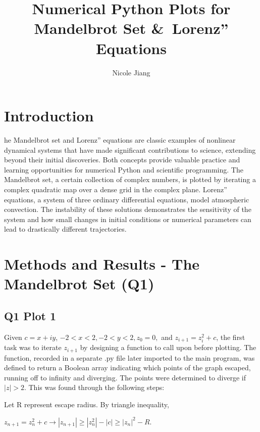\documentclass[9pt,a4paper,twocolumn,twoside]{tau-class/tau}
\title{Numerical Python Plots for Mandelbrot Set \&\ Lorenz'' Equations   }
\author{Nicole Jiang}
\begin{document}
		
    \maketitle 
    \thispagestyle{firststyle} 
    \tauabstract 
    

\section{Introduction}
    he Mandelbrot set and Lorenz'' equations are classic examples of nonlinear dynamical systems that have made significant contributions to science, extending beyond their initial discoveries. Both concepts provide valuable practice and learning opportunities for numerical Python and scientific programming. The Mandelbrot set, a certain collection of complex numbers, is plotted by iterating a complex quadratic map over a dense grid in the complex plane. Lorenz'' equations, a system of three ordinary differential equations, model atmospheric convection. The instability of these solutions demonstrates the sensitivity of the system and how small changes in initial conditions or numerical parameters can lead to drastically different trajectories. 

\section{Methods and Results - The Mandelbrot Set (Q1)}
\subsection{Q1 Plot 1}
    Given \(c = x + iy\), \(-2 < x < 2, -2 < y < 2, z_0 = 0,\) and \(z_{i + 1} = z^2_i + c\), the first task was to iterate \(z_{i+1}\) by designing a function to call upon before plotting. The function, recorded in a separate .py file later imported to the main program, was defined to return a Boolean array indicating which points of the graph escaped, running off to infinity and diverging. The points were determined to diverge if \(|z| > 2\). This was found through the following steps: \medskip

    Let R represent escape radius. By triangle inequality,
    \medskip
    
    \(z_{n+1} = z^2_n + c \rightarrow |z_{n+1}| \ge |z^2_n| - |c| \ge |z_n|^2 - R\). 
    \medskip
    
\end{document}
